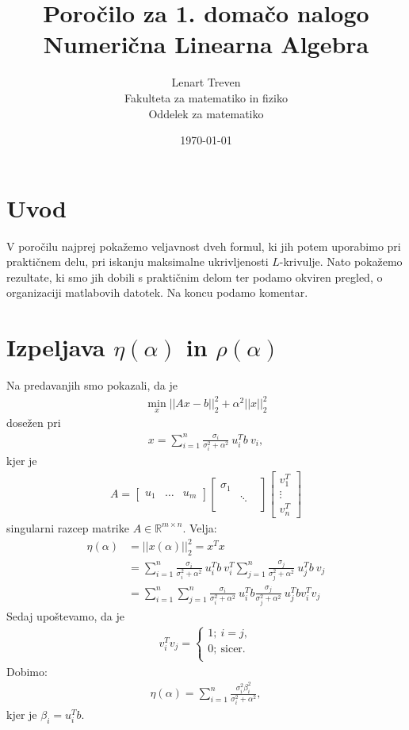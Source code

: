 \documentclass[a4paper,12pt]{article}
\title{Poročilo za 1. domačo nalogo  \\ 
\Large Numerična Linearna Algebra}
\author{Lenart Treven \\
Fakulteta za matematiko in fiziko \\
Oddelek za matematiko}
\date{\today}
\def\R{\mathbb{R}} %
\begin{document}


\maketitle
\section{Uvod}
V poročilu najprej pokažemo veljavnost dveh formul, ki jih potem uporabimo pri praktičnem delu, pri iskanju maksimalne ukrivljenosti $L$-krivulje. Nato pokažemo rezultate, ki smo jih dobili s praktičnim delom ter podamo okviren pregled, o organizaciji matlabovih datotek. Na koncu podamo komentar. 




\section{Izpeljava $\eta(\alpha)$ in $\rho(\alpha)$}


Na predavanjih smo pokazali, da je 
\begin{align*}
	\min_{x}||Ax -b||_{2}^2 + \alpha^2||x||_{2}^2
\end{align*}
dosežen pri
\begin{align}\label{x}
	x = \sum_{i=1}^{n}\frac{\sigma_i}{\sigma_i^2+\alpha^2}~u_i^Tb~v_i,
\end{align}
kjer je 
\begin{align*}
	A = \begin{bmatrix}
	u_1 & \ldots & u_m 
	\end{bmatrix} 
	\begin{bmatrix}
	\sigma_1 &  &  \\
	& \ddots &  \\
	&  &  
	\end{bmatrix} 
	\begin{bmatrix}
	v_1^T \\
	\vdots \\
	v_n^T 
	\end{bmatrix}
\end{align*}
singularni razcep matrike $A \in \R^{m\times n}.$ 
Velja: 
\begin{align*}
	\eta(\alpha) &= ||x(\alpha)||_2^2 = x^Tx \\
	&=  \sum_{i=1}^{n}\frac{\sigma_i}{\sigma_i^2+\alpha^2}~u_i^Tb~v_i^T \sum_{j=1}^{n}\frac{\sigma_j}{\sigma_j^2+\alpha^2}~u_j^Tb~v_j \\
	&= \sum_{i=1}^{n}\sum_{j=1}^{n}\frac{\sigma_i}{\sigma_i^2+\alpha^2}~u_i^Tb\frac{\sigma_j}{\sigma_j^2+\alpha^2}~u_j^Tbv_i^Tv_j 
\end{align*}
Sedaj upoštevamo, da je 
\begin{align*}
	v_i^Tv_j =
	\begin{cases}
	1; ~i = j,\\
	0;~ \text{sicer}.\\
	\end{cases}
\end{align*}
Dobimo:
\begin{align*}
	\eta(\alpha) = \sum_{i=1}^{n}\frac{\sigma_i^2\beta_i^2}{\sigma_i^2+\alpha^2},
\end{align*}
kjer je $\beta_i = u_i^Tb.$
\end{document}
